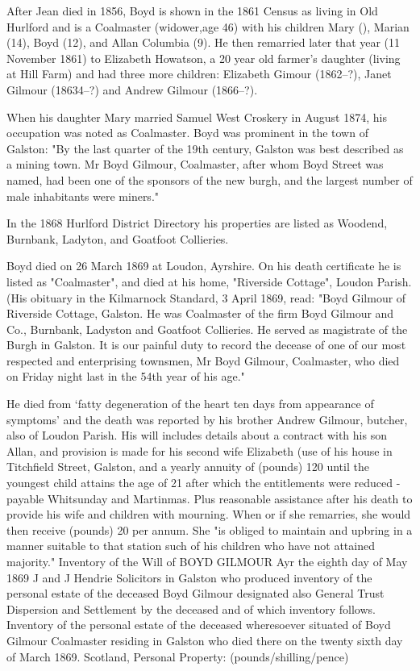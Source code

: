 After Jean died in 1856, Boyd is shown in the 1861 Census as living in Old Hurlford and is a Coalmaster (widower,age 46) with his children Mary (), Marian (14), Boyd (12), and Allan Columbia (9). He then remarried later that year (11 November 1861) to Elizabeth Howatson, a 20 year old farmer's daughter (living at Hill Farm) and had three more children: Elizabeth Gimour (1862--?), Janet Gilmour (18634--?) and Andrew Gilmour (1866--?).

When his daughter Mary married Samuel West Croskery in August 1874,  his occupation was noted as Coalmaster.\cite{SMWCmarriage}  Boyd was prominent in the town of Galston: "By the last quarter of the 19th century, Galston was best described as a mining town. Mr Boyd Gilmour, Coalmaster, after whom Boyd Street was named, had been one of the sponsors of the new burgh, and the largest number of male inhabitants were miners." 

In the 1868 Hurlford District Directory his properties are listed as Woodend, Burnbank, Ladyton, and Goatfoot Collieries.

Boyd died on 26 March 1869 at Loudon, Ayrshire. \cite{BGilmourDeath} On his death certificate he is listed as "Coalmaster", and died at his home, "Riverside Cottage", Loudon Parish. (His obituary in the Kilmarnock Standard, 3 April 1869, read:  "Boyd Gilmour of Riverside Cottage, Galston. He was Coalmaster of the firm Boyd Gilmour and Co., Burnbank, Ladyston and Goatfoot Collieries. He served as magistrate of the Burgh in Galston. It is our painful duty to record the decease of one of our most respected and enterprising townsmen, Mr Boyd Gilmour, Coalmaster, who died on Friday night last in the 54th year of his age." \cite{BGobituary}

  He died from `fatty degeneration of the heart ten days from appearance of symptoms' and the death was reported by his brother Andrew Gilmour, butcher, also of Loudon Parish. His will includes details about a contract with his son Allan, and provision is made for his second wife Elizabeth (use of his house in Titchfield Street, Galston, and a yearly annuity of (pounds) 120 until the youngest child attains the age of 21 after which the entitlements were reduced - payable Whitsunday and Martinmas. Plus reasonable assistance after his death to provide his wife and children with mourning. When or if she remarries, she would then receive (pounds) 20 per annum. She "is obliged to maintain and upbring in a manner suitable to that station such of his children who have not attained majority."      Inventory of the Will of BOYD GILMOUR
    Ayr the eighth day of May 1869 J and J Hendrie Solicitors in Galston who produced inventory of the personal estate of the deceased Boyd Gilmour designated also General Trust Dispersion and Settlement by the deceased and of which inventory follows.
    Inventory of the personal estate of the deceased wheresoever situated of Boyd Gilmour Coalmaster residing in Galston who died there on the twenty sixth day of March 1869.
    Scotland, Personal Property:
    (pounds/shilling/pence)


